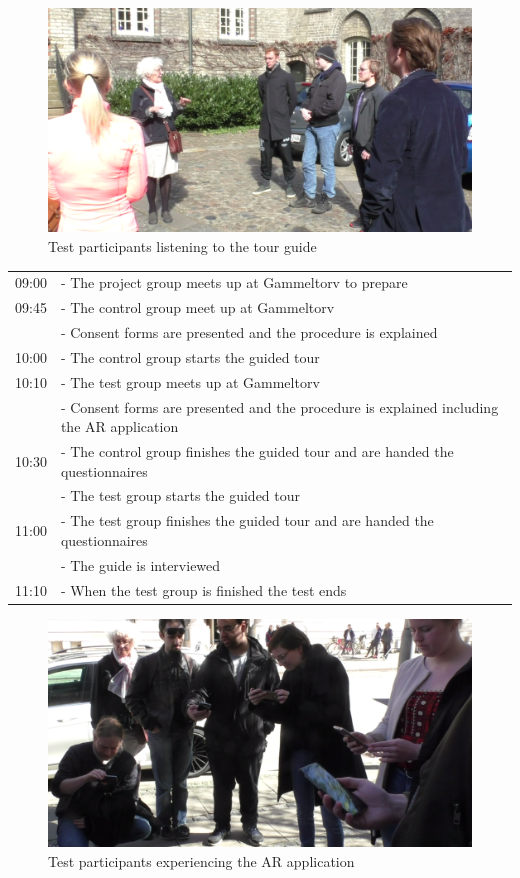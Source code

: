 \begin{figure}[h!]
   \centering
   \includegraphics[width=\textwidth]{figures/participants_listen.png}
   \caption{Test participants listening to the tour guide}\label{fig:participants_listen}
\end{figure}

\begin{tabular}{l p{12cm}}
09:00 & - The project group meets up at Gammeltorv to prepare \\
09:45 & - The control group meet up at Gammeltorv \\
 & - Consent forms are presented and the procedure is explained \\
10:00 &   - The control group starts the guided tour \\
10:10 & - The test group meets up at Gammeltorv \\
 & - Consent forms are presented and the procedure is explained including the AR application \\
10:30 & - The control group finishes the guided tour and are handed the questionnaires \\
 & - The test group starts the guided tour
\\ 
11:00 & - The test group finishes the guided tour and are handed the questionnaires \\
 & - The guide is interviewed \\
11:10 & - When the test group is finished the test ends \\
\end{tabular}\pagebreak

\begin{figure}[h!]
   \centering
   \includegraphics[width=\textwidth]{figures/participants_app.png}
   \caption{Test participants experiencing the AR application}\label{fig:participants_app}
\end{figure}

